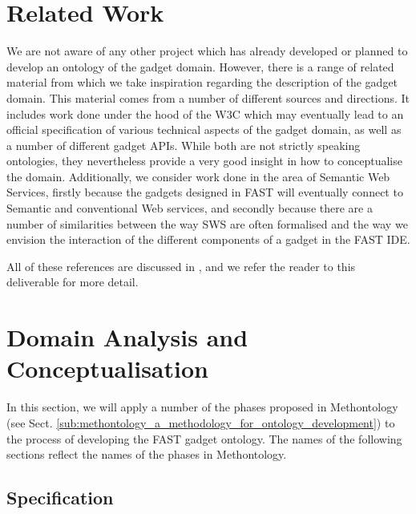 \documentclass[twoside]{fast_latex}
\begin{document}


\clearpage
\section{Related Work} %
\label{sec:related_work}

We are not aware of any other project which has already developed or planned to develop an ontology of the gadget domain. However, there is a range of related material from which we take inspiration regarding the description of the gadget domain. This material comes from a number of different sources and directions. It includes work done under the hood of the W3C which may eventually lead to an official specification of various technical aspects of the gadget domain, as well as a number of different gadget APIs. While both are not strictly speaking ontologies, they nevertheless provide a very good insight in how to conceptualise the domain. Additionally, we consider work done in the area of Semantic Web Services, firstly because the gadgets designed in FAST will eventually connect to Semantic and conventional Web services, and secondly because there are a number of similarities between the way SWS are often formalised and the way we envision the interaction of the different components of a gadget in the FAST IDE.

All of these references are discussed in \cite{urmetzer2010fast_state_of_the_art}, and we refer the reader to this deliverable for more detail.

\clearpage
\section{Domain Analysis and Conceptualisation} %
\label{sec:domain_analysis}

In this section, we will apply a number of the phases proposed in Methontology (see Sect. \ref{sub:methontology_a_methodology_for_ontology_development}) to the process of developing the FAST gadget ontology. The names of the following sections reflect the names of the phases in Methontology.

\subsection{Specification} %
\label{sub:specification}
\end{document}
